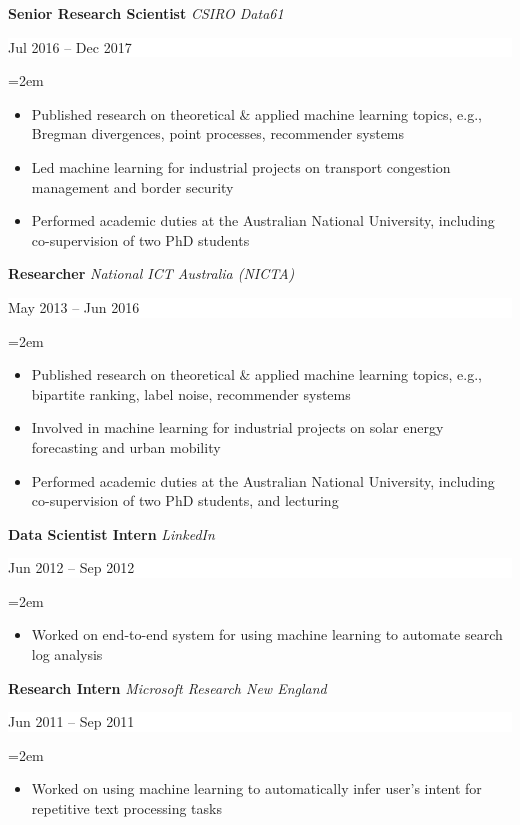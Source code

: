 \documentclass{article}
\newcommand{\EducationEntry}[4]{
    \noindent \textbf{#1}
    \textit{#3}
    \hfill      %
    \colorbox{White}{
      \parbox{9em}{
      \hfill\color{Black}#2}} \par  %
    \noindent\hangindent=2em\hangafter=0 \small #4 %
    \normalsize \par}
\newcommand{\WorkEntry}[4]{       %
    \noindent
    \textbf{#1}
    \textit{#3} %
    \hfill      %
    \colorbox{White}{%
      \parbox{9em}{%
      \hfill\color{Black}#2}} \par   %
    \noindent\hangindent=2em\hangafter=0 \small #4 %
    \normalsize \par}
\begin{document}
\WorkEntry
{Senior Research Scientist}
{Jul 2016 -- Dec 2017}
{CSIRO Data61}
{
\begin{itemize} \itemsep -1pt
        \item
            Published research on theoretical \& applied machine learning topics, e.g., Bregman divergences, point processes, recommender systems

        \item
            Led machine learning for industrial projects on {transport congestion management} and {border security}

        \item
            Performed academic duties at the Australian National University, including co-supervision of two PhD students
\end{itemize}
}

\WorkEntry
{Researcher}
{May 2013 -- Jun 2016}
{National ICT Australia (NICTA)}
{
\begin{itemize} \itemsep -1pt
        \item
            Published research on theoretical \& applied machine learning topics, e.g., bipartite ranking, label noise, recommender systems

        \item
            Involved in machine learning for industrial projects on {solar energy forecasting} and urban mobility

        \item
            Performed academic duties at the Australian National University, including co-supervision of two PhD students, and lecturing
\end{itemize}
}

\WorkEntry
{Data Scientist Intern}
{Jun 2012 -- Sep 2012}
{LinkedIn}
{
\begin{itemize} \itemsep -1pt
        \item Worked on end-to-end system for using machine learning to automate search log analysis
\end{itemize}
}

\WorkEntry
{Research Intern}
{Jun 2011 -- Sep 2011}
{Microsoft Research New England}
{
\begin{itemize} \itemsep -1pt
        \item Worked on using machine learning to automatically infer user's intent for repetitive text processing tasks
\end{itemize}
}
\end{document}

